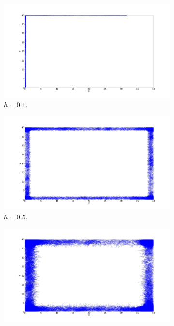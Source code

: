 \begin{figure}[ht]
	\centering
	\begin{subfigure}[b]{0.55\textwidth}
		\centering
		\includegraphics[width=\textwidth]{LateX images/log/h/g1-2.1}
		\caption{$h =0.1$.}
		\label{f:g104}
	\end{subfigure}
	\hfill
	\begin{subfigure}[b]{0.55\textwidth}
		\centering
		\includegraphics[width=\textwidth]{LateX images/log/h/g2-2.1}
		\caption{$h =0.5$.}
		\label{f:g105}
	\end{subfigure}
	\hfill
	\begin{subfigure}[b]{0.55\textwidth}
		\centering
		\includegraphics[width=\textwidth]{LateX images/log/h/g3-2.1}

\end{subfigure}
\end{figure}
